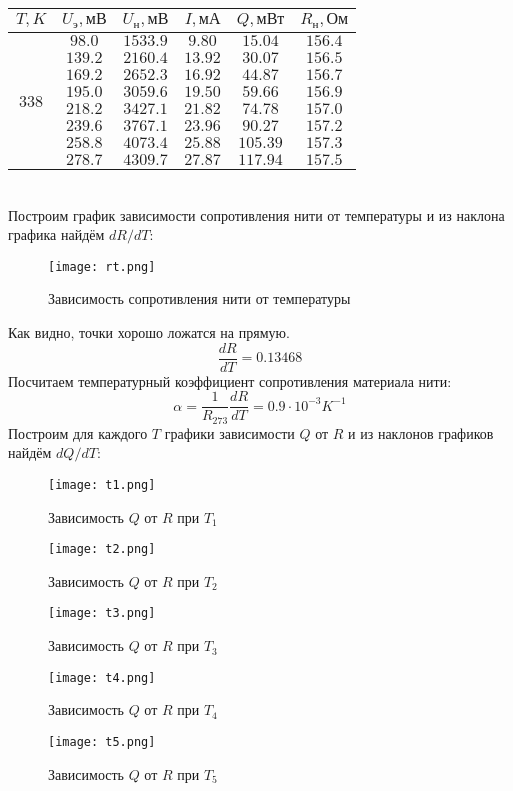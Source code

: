 \documentclass[20pt]{article}
\begin{document}
\begin{tabular}{|c|c|c|c|c|c|}
\hline $T, K$ & $U_\text{э}, \text{мВ}$ & $U_{\text{н}}, \text{мВ}$ & $I, \text{мА}$ & $Q, \text{мВт}$ & $R_{\text{н}}, \text{Ом}$ \\\hline
\multirow{8}{*}{338}
 & $98.0$ & $1533.9$ & $9.80$ & $15.04$ & $156.4$ \\\cline{2-6}
 & $139.2$ & $2160.4$ & $13.92$ & $30.07$ & $156.5$ \\\cline{2-6}
 & $169.2$ & $2652.3$ & $16.92$ & $44.87$ & $156.7$ \\\cline{2-6}
 & $195.0$ & $3059.6$ & $19.50$ & $59.66$ & $156.9$ \\\cline{2-6}
 & $218.2$ & $3427.1$ & $21.82$ & $74.78$ & $157.0$ \\\cline{2-6}
 & $239.6$ & $3767.1$ & $23.96$ & $90.27$ & $157.2$ \\\cline{2-6}
 & $258.8$ & $4073.4$ & $25.88$ & $105.39$ & $157.3$ \\\cline{2-6}
 & $278.7$ & $4309.7$ & $27.87$ & $117.94$ & $157.5$ \\\hline
\end{tabular}\\
Построим график зависимости сопротивления нити от температуры и из наклона графика найдём $dR/dT$:
\begin{figure}[H]
	\centering
	\caption{Зависимость сопротивления нити от температуры}
	\texttt{[image: rt.png]}
\end{figure}
Как видно, точки хорошо ложатся на прямую.
\[
	\frac{dR}{dT} = 0.13468 
\]
Посчитаем температурный коэффициент сопротивления материала нити:
\[
	\alpha = \frac{1}{R_{273}} \frac{dR}{dT} = 0.9 \cdot 10^{-3} K^{-1}
\]
Построим для каждого $T$ графики зависимости $Q$ от $R$ и из наклонов графиков найдём $dQ/dT$:
\begin{figure}[H]
	\centering
	\caption{Зависимость $Q$ от $R$ при $T_1$}
	\texttt{[image: t1.png]}
\end{figure}
\begin{figure}[H]
	\centering
	\caption{Зависимость $Q$ от $R$ при $T_2$}
	\texttt{[image: t2.png]}
\end{figure}
\begin{figure}[H]
	\centering
	\caption{Зависимость $Q$ от $R$ при $T_3$}
	\texttt{[image: t3.png]}
\end{figure}\begin{figure}[H]
	\centering
	\caption{Зависимость $Q$ от $R$ при $T_4$}
	\texttt{[image: t4.png]}
\end{figure}\begin{figure}[H]
	\centering
	\caption{Зависимость $Q$ от $R$ при $T_5$}
	\texttt{[image: t5.png]}
\end{figure}
\end{document}
